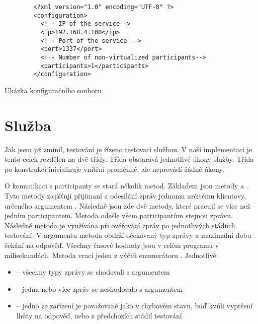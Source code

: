 \begin{listing}
    \begin{verbatim}
        <?xml version="1.0" encoding="UTF-8" ?>
        <configuration>
          <!-- IP of the service-->
          <ip>192.168.4.100</ip>
          <!-- Port of the service -->
          <port>1337</port>
          <!-- Number of non-virtualized participants-->
          <participants>1</participants>
        </configuration>
    \end{verbatim}
    \caption{Ukázka konfiguračního souboru}
    \label{listing:configxml}
\end{listing}


\section{Služba}
Jak jsem již zmínil, testování je řízeno testovací službou. V naší implementaci je tento celek rozdělen na dvě třídy. Třída  obstarává jednotlivé úkony služby. Třída po konstrukci inicializuje vnitřní proměnné, ale neprovádí žádné úkony. 

O komunikaci s participanty se stará několik metod. Základem jsou metody  a . Tyto metody zajišťují přijímaní a odesílání zpráv jednomu určitému klientovy, určeného argumentem . Následně jsou zde dvě metody, které pracují se více než jedním participantem. Metoda  odešle všem participantům stejnou zprávu. Následně metoda  je využívána při ověřování zpráv po jednotlivých stádiích testování. V argumentu metoda obdrží očekávaný typ zprávy a maximální dobu čekání na odpověď. Všechny časové hodnoty jsou v celém programu v milisekundách. Metoda vrací jeden z výčtů enumerátoru . Jednotlivě:

\begin{itemize}
    \item {} -- všechny typy zprávy se shodovali s argumentem 
    \item {}  -- jedna nebo více zpráv se neshodovalo s argumentem 
    \item {} -- jedno ze zařízení je považované jako v chybovém stavu, buď kvůli vypršení lhůty na odpověď, nebo z předchozích stádií testování.   
\end{itemize}


